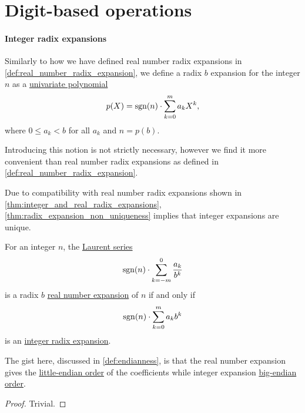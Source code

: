 \section{Digit-based operations}\label{sec:digit_based_operations}

\paragraph{Integer radix expansions}

\begin{definition}\label{def:integer_radix_expansion}
  Similarly to how we have defined real number radix expansions in \cref{def:real_number_radix_expansion}, we define a radix \( b \) expansion for the integer \( n \) as a \hyperref[def:univariate_polynomial]{univariate polynomial}
  \begin{equation*}
    p(X) = \operatorname{sgn}(n) \cdot \sum_{k=0}^m a_k X^k,
  \end{equation*}
  where \( 0 \leq a_k < b \) for all \( a_k \) and \( n = p(b) \).
\end{definition}
\begin{comments}
  \item Introducing this notion is not strictly necessary, however we find it more convenient than real number radix expansions as defined in \cref{def:real_number_radix_expansion}.

  \item Due to compatibility with real number radix expansions shown in \cref{thm:integer_and_real_radix_expansions}, \cref{thm:radix_expansion_non_uniqueness} implies that integer expansions are unique.
\end{comments}

\begin{proposition}\label{thm:integer_and_real_radix_expansions}
  For an integer \( n \), the \hyperref[def:formal_laurent_series]{Laurent series}
  \begin{equation}\label{eq:thm:integer_and_real_radix_expansions/series}
    \operatorname{sgn}(n) \cdot \sum_{k=-m}^0 \frac {a_k} {b^k}
  \end{equation}
  is a radix \( b \) \hyperref[def:real_number_radix_expansion]{real number expansion} of \( n \) if and only if
  \begin{equation}\label{eq:thm:integer_and_real_radix_expansions/polynomial}
    \operatorname{sgn}(n) \cdot \sum_{k=0}^m a_k b^k
  \end{equation}
  is an \hyperref[def:integer_radix_expansion]{integer radix expansion}.
\end{proposition}
\begin{comments}
  \item The gist here, discussed in \cref{def:endianness}, is that the real number expansion gives the \hyperref[def:endianness]{little-endian order} of the coefficients while integer expansion \hyperref[def:endianness]{big-endian order}.
\end{comments}
\begin{proof}
  Trivial.
\end{proof}

